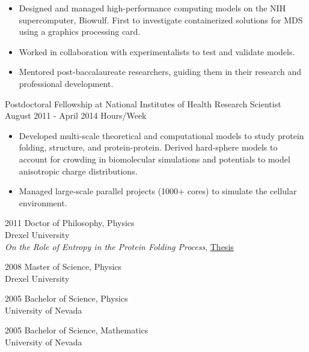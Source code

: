 \documentclass[]{scrartcl}
\begin{document}
\begin{cleanCV}
{\begin{itemize}
  \item Designed and managed high-performance computing models on the NIH supercomputer, Biowulf. First to investigate containerized solutions for MDS using a graphics processing card.

  \item Worked in collaboration with experimentalists to test and validate models.
   \item Mentored post-baccalaureate researchers, guiding them in their research and professional development.

  \end{itemize}
}


\WorkExperience
{}
{Postdoctoral Fellowship at National Institutes of Health}
{\newline Research Scientist}
{
  \newline August 2011 - April 2014
   Hours/Week
}
{
  \begin{itemize}
  \item Developed multi-scale theoretical and computational models to study protein folding, structure, and protein-protein. Derived hard-sphere models to account for crowding in biomolecular simulations and potentials to model anisotropic charge distributions.
  \item Managed large-scale parallel projects (1000+ cores) to simulate the cellular environment.
  \end{itemize}
}



\WorkExperience
{2011}
{Doctor of Philosophy, Physics}
{
\\Drexel University
\\\emph{On the Role of Entropy in the Protein Folding Process}, \href{https://idea.library.drexel.edu/islandora/object/idea:3488}{Thesis}
}

\WorkExperience
{2008}
{Master of Science, Physics}
{\\Drexel University}

\WorkExperience
{2005}
{Bachelor of Science, Physics}
{\\University of Nevada}

\WorkExperience
{2005}
{Bachelor of Science, Mathematics}
{\\University of Nevada}


\end{cleanCV}
\end{document}
